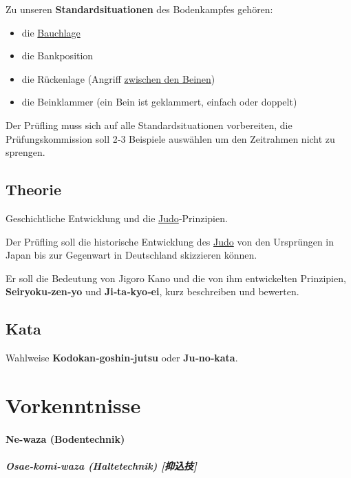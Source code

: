 \documentclass[justified, a4paper, notitlepage, captions=tableheading, nobib]{tufte-handout}
\begin{document}
Zu unseren \textbf{Standardsituationen} des Bodenkampfes gehören:
\begin{itemize}
\item die \hyperref[org22fd945]{Bauchlage}
\item die Bankposition
\item die Rückenlage (Angriff \hyperref[org891f77f]{zwischen den Beinen})
\item die Beinklammer (ein Bein ist geklammert, einfach oder doppelt)
\end{itemize}

Der Prüfling muss sich auf alle Standardsituationen vorbereiten, die Prüfungskommission soll 2‐3 Beispiele auswählen um den Zeitrahmen nicht zu sprengen.

\subsection{Theorie}
\label{sec:org924c5c3}
Geschichtliche Entwicklung und die \hyperref[org4f88021]{Judo}‐Prinzipien.

Der Prüfling soll die historische Entwicklung des \hyperref[org4f88021]{Judo} von den Ursprüngen in Japan bis zur Gegenwart in Deutschland skizzieren können.

Er soll die Bedeutung von Jigoro Kano und die von ihm entwickelten Prinzipien, \textbf{Seiryoku‐zen‐yo} und \textbf{Ji‐ta‐kyo‐ei}, kurz beschreiben und bewerten.

\subsection{Kata}
\label{sec:orgfcb2e2e}
Wahlweise \textbf{Kodokan‐goshin‐jutsu} oder \textbf{Ju‐no‐kata}.


\newpage
\section{Vorkenntnisse }
\label{sec:org613a240}

\paragraph{Ne-waza (Bodentechnik)}
\label{sec:org29a9d8b}

\subparagraph{Osae-komi-waza (Haltetechnik) [抑込技] }
\label{sec:orga7ea790}
\end{document}
